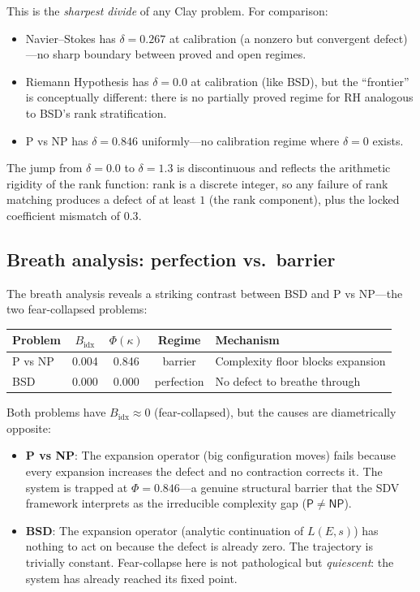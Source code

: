 \documentclass[11pt]{article}
\begin{document}
\noindent
This is the \emph{sharpest divide} of any Clay problem.  For comparison:
\begin{itemize}
  \item Navier--Stokes has $\delta = 0.267$ at calibration (a nonzero but
    convergent defect)---no sharp boundary between proved and open regimes.
  \item Riemann Hypothesis has $\delta = 0.0$ at calibration (like BSD), but
    the ``frontier'' is conceptually different: there is no partially proved
    regime for RH analogous to BSD's rank stratification.
  \item P vs NP has $\delta = 0.846$ uniformly---no calibration regime where
    $\delta = 0$ exists.
\end{itemize}

The jump from $\delta = 0.0$ to $\delta = 1.3$ is discontinuous and reflects
the arithmetic rigidity of the rank function: rank is a discrete integer, so
any failure of rank matching produces a defect of at least $1$ (the rank
component), plus the locked coefficient mismatch of $0.3$.

\subsection{Breath analysis: perfection vs.\ barrier}

The breath analysis reveals a striking contrast between BSD and P vs NP---the
two fear-collapsed problems:

\begin{center}
\begin{tabular}{lcccl}
\hline
\textbf{Problem} & $B_{\mathrm{idx}}$ & $\Phi(\kappa)$ & Regime
  & \textbf{Mechanism} \\
\hline
P vs NP & 0.004 & 0.846 & barrier & Complexity floor blocks expansion \\
BSD & 0.000 & 0.000 & perfection & No defect to breathe through \\
\hline
\end{tabular}
\end{center}

\noindent
Both problems have $B_{\mathrm{idx}} \approx 0$ (fear-collapsed), but the
causes are diametrically opposite:
\begin{itemize}
  \item \textbf{P vs NP}: The expansion operator (big configuration moves)
    fails because every expansion increases the defect and no contraction
    corrects it.  The system is trapped at $\Phi = 0.846$---a genuine
    structural barrier that the SDV framework interprets as the irreducible
    complexity gap ($\mathsf{P} \neq \mathsf{NP}$).
  \item \textbf{BSD}: The expansion operator (analytic continuation of
    $L(E,s)$) has nothing to act on because the defect is already zero.  The
    trajectory is trivially constant.  Fear-collapse here is not pathological
    but \emph{quiescent}: the system has already reached its fixed point.
\end{itemize}
\end{document}
